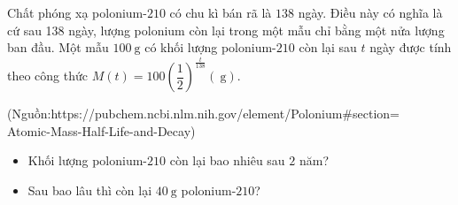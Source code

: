 \begin{bt}%
	Chất phóng xạ polonium-$210$ có chu kì bán rã là $138$ ngày. Điều này có nghĩa là cứ sau 138 ngày, lượng polonium còn lại trong một mẫu chỉ bằng một nửa lượng ban đầu. Một mẫu $100 \mathrm{~g}$ có khối lượng polonium-$210$ còn lại sau $t$ ngày được tính theo công thức $M(t)=100\left(\dfrac{1}{2}\right)^{\tfrac{t}{138}}(\mathrm{~g})$.
	\begin{flushright}
		(Nguồn:https://pubchem.ncbi.nlm.nih.gov/element/Polonium\#section=\\
		Atomic-Mass-Half-Life-and-Decay)
	\end{flushright}
	\begin{itemize}
		\item[a)] Khối lượng polonium-$210$ còn lại bao nhiêu sau $2$ năm?
		\item[b)] Sau bao lâu thì còn lại $40 \mathrm{~g}$ polonium-$210$?
	\end{itemize}
\end{bt}

